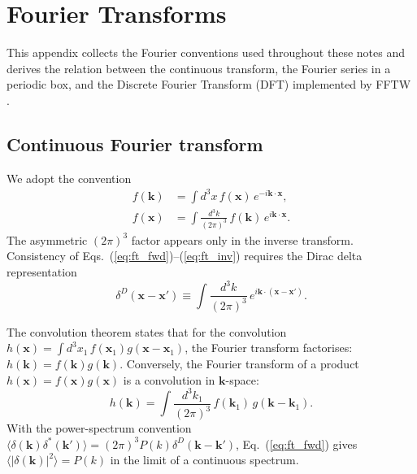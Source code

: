 \documentclass[12pt]{article}
\newcommand{\bx}{\mathbf{x}}
\newcommand{\bk}{\mathbf{k}}
\begin{document}


\appendix

\section{Fourier Transforms}
\label{app:fft}

This appendix collects the Fourier conventions used throughout these
notes and derives the relation between the continuous transform, the
Fourier series in a periodic box, and the Discrete Fourier Transform
(DFT) implemented by FFTW \citep{Jeong2010}.

\subsection{Continuous Fourier transform}
\label{app:fft_cont}

We adopt the convention
%
\begin{align}
  f(\bk) &= \int d^3x\, f(\bx)\,e^{-i\bk\cdot\bx},
  \label{eq:ft_fwd}\\
  f(\bx) &= \int \frac{d^3k}{(2\pi)^3}\, f(\bk)\,e^{i\bk\cdot\bx}.
  \label{eq:ft_inv}
\end{align}
%
The asymmetric $(2\pi)^3$ factor appears only in the inverse
transform.  Consistency of Eqs.~(\ref{eq:ft_fwd})--(\ref{eq:ft_inv})
requires the Dirac delta representation
%
\begin{equation}
  \delta^D(\bx - \bx') \equiv
    \int \frac{d^3k}{(2\pi)^3}\,e^{i\bk\cdot(\bx-\bx')}.
  \label{eq:dirac}
\end{equation}

The convolution theorem states that for the convolution
$h(\bx) = \int d^3x_1\,f(\bx_1)g(\bx-\bx_1)$, the Fourier transform
factorises: $h(\bk) = f(\bk)g(\bk)$.
Conversely, the Fourier transform of a product $h(\bx) = f(\bx)g(\bx)$
is a convolution in $\bk$-space:
%
\begin{equation}
  h(\bk) = \int \frac{d^3k_1}{(2\pi)^3}\,f(\bk_1)\,g(\bk-\bk_1).
  \label{eq:conv}
\end{equation}
%
With the power-spectrum convention
$\langle\delta(\bk)\delta^*(\bk')\rangle =
(2\pi)^3P(k)\delta^D(\bk-\bk')$,
Eq.~(\ref{eq:ft_fwd}) gives $\langle|\delta(\bk)|^2\rangle = P(k)$
in the limit of a continuous spectrum.
\end{document}
